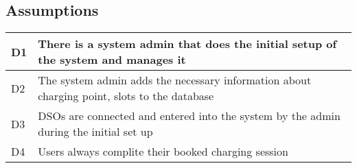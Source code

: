 \subsection{Assumptions}
\begin{tabular}{|l|l|}
	\hline
	D1 & There is a system admin that does the initial setup of the system and manages it \\
	\hline
	D2 & The system admin adds the necessary information about charging point, slots to the database \\
	\hline
	D3 & DSOs are connected and entered into the system by the admin during the initial set up\\
	\hline
	D4 & Users always complite their booked charging session\\
	\hline
\end{tabular}
